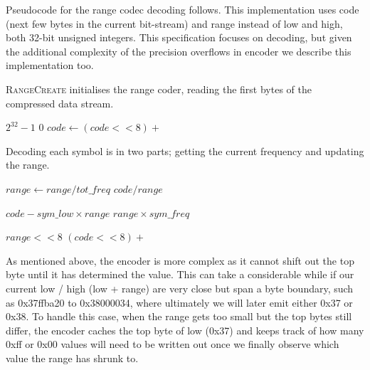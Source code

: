 \documentclass[a4paper]{article}
\begin{document}
Pseudocode for the range codec decoding follows.
This implementation uses code (next few bytes in the current bit-stream) and range instead of low and high, both 32-bit unsigned integers.
This specification focuses on decoding, but given the additional complexity of the precision overflows in encoder we describe this implementation too.

\textsc{RangeCreate} initialises the range coder, reading the first bytes of the compressed data stream.

\begin{algorithmic}[1]
  \settowidth{\maxwidth}{range\ }
  \State {} $2^{32}-1$
  \State {} $0$
    \State $code \gets (code << 8) + $
  \EndFor
\EndProcedure
\end{algorithmic}

Decoding each symbol is in two parts; getting the current frequency and updating the range.

\begin{algorithmic}[1]
  \State $range \gets range / tot\_freq$
  \State \Return $code / range$
\EndFunction
\end{algorithmic}

\begin{algorithmic}[1]
  \settowidth{\maxwidth}{range\ }
  \State {} $code - sym\_low \times range$
  \State {} $range \times sym\_freq$

   
    \settowidth{\maxwidth}{range\ }
    \State {} $range << 8$
    \State {} $(code<<8) + $
  \EndWhile
\EndProcedure
\end{algorithmic}

As mentioned above, the encoder is more complex as it cannot shift out the top byte until it has determined the value.
This can take a considerable while if our current low / high (low + range) are very close but span a byte boundary, such as 0x37ffba20 to 0x38000034, where ultimately we will later emit either 0x37 or 0x38.
To handle this case, when the range gets too small but the top bytes still differ, the encoder caches the top byte of low (0x37) and keeps track of how many 0xff or 0x00 values will need to be written out once we finally observe which value the range has shrunk to.
\end{document}
